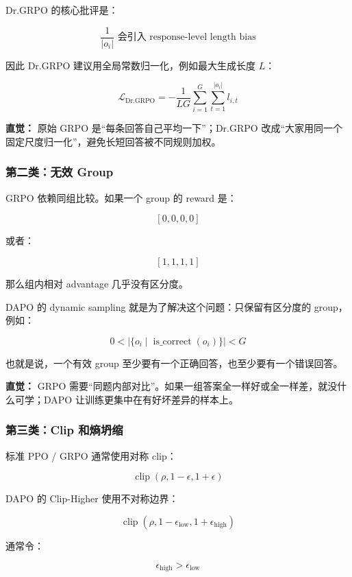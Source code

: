 Dr.GRPO 的核心批评是：

\[
\frac{1}{|o_i|}
\text{ 会引入 response-level length bias}
\]

因此 Dr.GRPO 建议用全局常数归一化，例如最大生成长度 $L$：

\[
\mathcal{L}_\text{Dr.GRPO}
=
-
\frac{1}{LG}
\sum_{i=1}^{G}
\sum_{t=1}^{|o_i|}
l_{i,t}
\]

\begin{intubox}
\textbf{直觉：} 原始 GRPO 是“每条回答自己平均一下”；Dr.GRPO 改成“大家用同一个固定尺度归一化”，避免长短回答被不同规则加权。
\end{intubox}

\subsubsection{第二类：无效 Group}

GRPO 依赖同组比较。如果一个 group 的 reward 是：

\[
[0,0,0,0]
\]

或者：

\[
[1,1,1,1]
\]

那么组内相对 advantage 几乎没有区分度。

DAPO 的 dynamic sampling 就是为了解决这个问题：只保留有区分度的 group，例如：

\[
0
<
\left|
\{o_i \mid \operatorname{is\_correct}(o_i)\}
\right|
<
G
\]

也就是说，一个有效 group 至少要有一个正确回答，也至少要有一个错误回答。

\begin{summarybox}
\textbf{直觉：} GRPO 需要“同题内部对比”。如果一组答案全一样好或全一样差，就没什么可学；DAPO 让训练更集中在有好坏差异的样本上。
\end{summarybox}

\subsubsection{第三类：Clip 和熵坍缩}

标准 PPO / GRPO 通常使用对称 clip：

\[
\operatorname{clip}(\rho, 1-\epsilon, 1+\epsilon)
\]

DAPO 的 Clip-Higher 使用不对称边界：

\[
\operatorname{clip}
(\rho, 1-\epsilon_\text{low}, 1+\epsilon_\text{high})
\]

通常令：

\[
\epsilon_\text{high} > \epsilon_\text{low}
\]

